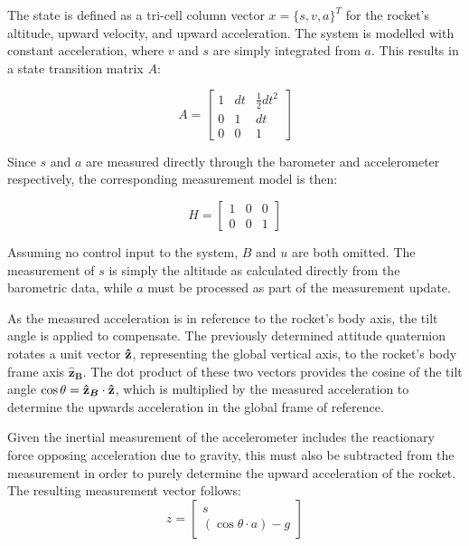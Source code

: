 The state is defined as a tri-cell column vector $x = \{s, v, a\}^T$ for the rocket's altitude, upward velocity, and upward acceleration. The system is modelled with constant acceleration, where $v$ and $s$ are simply integrated from $a$. This results in a state transition matrix $A$:
\begin{equation}
  A = \begin{bmatrix}
        1& dt& \frac{1}{2}dt^2\\
        0& 1& dt              \\
        0& 0& 1
      \end{bmatrix} 
  \label{eq:kalmanA}
\end{equation}

Since $s$ and $a$ are measured directly through the barometer and accelerometer respectively, the corresponding measurement model is then:

\begin{equation}
  H = \begin{bmatrix}
        1 & 0 & 0\\
        0 & 0 & 1
      \end{bmatrix}
  \label{eq:kalmanH}
\end{equation}

Assuming no control input to the system, $B$ and $u$ are both omitted. The measurement of $s$ is simply the altitude as calculated directly from the barometric data, while $a$ must be processed as part of the measurement update.

As the measured acceleration is in reference to the rocket's body axis, the tilt angle is applied to compensate. The previously determined attitude quaternion rotates a unit vector $\boldsymbol{\hat{\textbf{z}}}$, representing the global vertical axis, to the rocket's body frame axis $\bm{\hat{\textbf{z}}_B}$. The dot product of these two vectors provides the cosine of the tilt angle $\cos{\theta} = \bm{\hat{\textbf{z}}_B}\cdot \boldsymbol{\hat{\textbf{z}}}$, which is multiplied by the measured acceleration to determine the upwards acceleration in the global frame of reference. 

Given the inertial measurement of the accelerometer includes the reactionary force opposing acceleration due to gravity, this must also be subtracted from the measurement in order to purely determine the upward acceleration of the rocket. The resulting measurement vector follows:
\begin{equation}
  z = \begin{bmatrix}
        s\\
        (\cos{\theta}\cdot a)-g
      \end{bmatrix}
  \label{eq:kalmanZ}
\end{equation}

